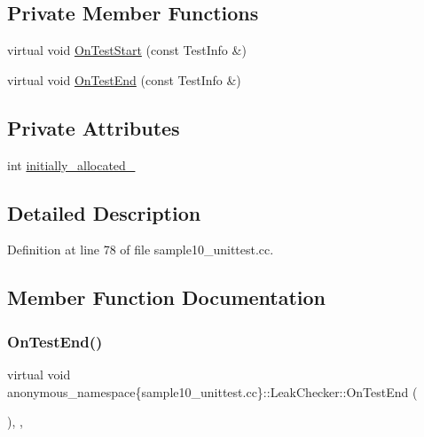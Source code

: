 \subsection*{Private Member Functions}
\begin{DoxyCompactItemize}
\item 
virtual void \hyperlink{classanonymous__namespace_02sample10__unittest_8cc_03_1_1LeakChecker_a7043434f443b9f39f9bbbccf07636809}{On\+Test\+Start} (const Test\+Info \&)
\item 
virtual void \hyperlink{classanonymous__namespace_02sample10__unittest_8cc_03_1_1LeakChecker_a1a67b81e7f76ed72443740b4edb05a7c}{On\+Test\+End} (const Test\+Info \&)
\end{DoxyCompactItemize}
\subsection*{Private Attributes}
\begin{DoxyCompactItemize}
\item 
int \hyperlink{classanonymous__namespace_02sample10__unittest_8cc_03_1_1LeakChecker_aa049de02dffd92c4b31d2c4964d9091f}{initially\+\_\+allocated\+\_\+}
\end{DoxyCompactItemize}


\subsection{Detailed Description}


Definition at line 78 of file sample10\+\_\+unittest.\+cc.



\subsection{Member Function Documentation}
\mbox{\label{classanonymous__namespace_02sample10__unittest_8cc_03_1_1LeakChecker_a1a67b81e7f76ed72443740b4edb05a7c}} 
\subsubsection{\texorpdfstring{On\+Test\+End()}{OnTestEnd()}}
{\footnotesize\ttfamily virtual void anonymous\+\_\+namespace\{sample10\+\_\+unittest.\+cc\}\+::Leak\+Checker\+::\+On\+Test\+End (\begin{DoxyParamCaption}\item[{const Test\+Info \&}]{ }\end{DoxyParamCaption})\hspace{0.3cm}{\ttfamily [inline]}, {\ttfamily [private]}, {\ttfamily [virtual]}}



